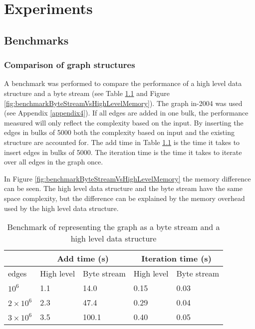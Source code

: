 \chapter{Experiments}

\section{Benchmarks}

\subsection{Comparison of graph structures} \label{bench:graphStructure}
A benchmark was performed to compare the performance of a high level data structure and a byte stream (see Table \ref{table:byteStreamHighLevelTime} and Figure \ref{fig:benchmarkByteStreamVsHighLevelMemory}). The graph in-2004 was used (see Appendix \ref{appendix4}). If all edges are added in one bulk, the performance measured will only reflect the complexity based on the input. By inserting the edges in bulks of 5000 both the complexity based on input and the existing structure are accounted for. The add time in Table \ref{table:byteStreamHighLevelTime} is the time it takes to insert edges in bulks of 5000. The iteration time is the time it takes to iterate over all edges in the graph once.

In Figure \ref{fig:benchmarkByteStreamVsHighLevelMemory} the memory difference can be seen. The high level data structure and the byte stream have the same space complexity, but the difference can be explained by the memory overhead used by the high level data structure. 

\begin{table}[h]
    \center
    \begin{tabular}{ | l | l | l | l | l |}
        \hline
            & \multicolumn{2}{c}{Add time (s)} \vline & \multicolumn{2}{c}{Iteration time (s)} \vline \\ \hline
        edges             & High level & Byte stream & High level & Byte stream \\ \hline
        $10^6$            & 1.1        & 14.0        & 0.15       & 0.03 \\ \hline
        $2 \times 10^6$   & 2.3        & 47.4        & 0.29       & 0.04 \\ \hline 
        $3 \times 10^6$   & 3.5        & 100.1       & 0.40       & 0.05 \\ \hline
    \end{tabular}
    \captionsetup{justification=centering}
    \caption{Benchmark of representing the graph as a byte stream and a high level data structure}
    \label{table:byteStreamHighLevelTime}
\end{table}

